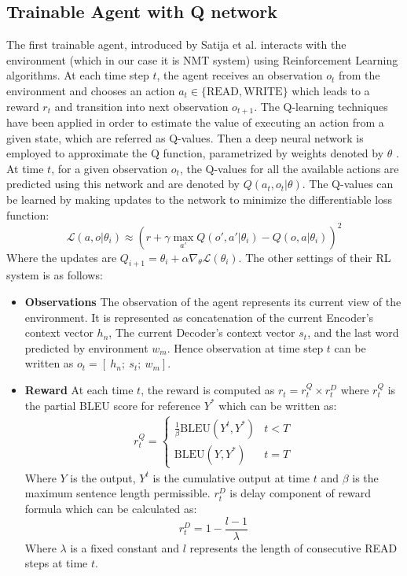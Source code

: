 \documentclass{sfuthesis}
\begin{document}
\subsection{Trainable Agent with Q network}\label{sub:SNMT2}
The first trainable agent, introduced by Satija et al. \cite{harsh:2016:ICML} interacts with the environment (which in our case it is NMT system) using Reinforcement Learning algorithms. At each time step $t$, the agent receives an observation $o_t$ from the environment and chooses an action $a_t \in \{\text{READ}, \text{WRITE}\}$ which leads to a reward $r_t$ and transition into next observation $o_{t+1}$. The Q-learning techniques have been applied in order to estimate the value of executing an action from a given state, which are referred as Q-values. Then a deep neural network is employed to approximate the Q function, parametrized by weights denoted by $\theta$ \cite{mnih:2015:nature}. At time $t$, for a given observation $o_t$, the Q-values for all the available actions are predicted using this network and are denoted by $Q(a_t, o_t|\theta)$. The Q-values can be learned by making updates to the network to minimize the differentiable loss function:
$$ \mathcal{L}(a, o| \theta_i) \approx ( r + \gamma \max_{a'} Q(o', a'| \theta_i) - Q(o, a| \theta_i) )^2 $$
Where the updates are $Q_{i+1} = \theta_i + \alpha \nabla_\theta \mathcal{L}(\theta_i)$.
The other settings of their RL system is as follows:
\begin{itemize}
    \item \textbf{Observations}
    The observation of the agent represents its current view of the environment. It is represented as concatenation of the current Encoder's context vector $h_n$, The current Decoder's context vector $s_t$, and the last word predicted by environment $w_m$. Hence observation at time step $t$ can be written as $o_t = [\ h_n;\ s_t;\ w_m]$.
    \item \textbf{Reward}
    At each time $t$, the reward is computed as $r_t = r_t^Q \times r_t^D$ where $r_t^Q$ is the partial BLEU score for reference $Y^*$ which can be written as:
    \begin{align*}
        r_t^Q = 
        \begin{cases}
        \frac{1}{\beta}\text{BLEU}(Y^t, Y^*) &  t<T\\
        \text{BLEU}(Y, Y^*)                  &  t=T
        \end{cases}
    \end{align*}
    Where $Y$ is the output, $Y^t$ is the cumulative output at time $t$ and $\beta$ is the maximum sentence length permissible. $r_t^D$ is delay component of reward formula which can be calculated as:
    $$r_t^D = 1 - \frac{l-1}{\lambda}$$
    Where $\lambda$ is a fixed constant and $l$ represents the length of consecutive READ steps at time $t$.
\end{itemize}
\end{document}
